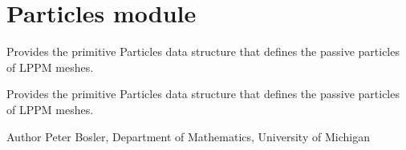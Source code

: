 \hypertarget{group___particles}{\section{Particles module}
\label{group___particles}
}


Provides the primitive Particles data structure that defines the passive particles of L\+P\+P\+M meshes.  


Provides the primitive Particles data structure that defines the passive particles of L\+P\+P\+M meshes. 

\begin{DoxyAuthor}{Author}
Peter Bosler, Department of Mathematics, University of Michigan 
\end{DoxyAuthor}
